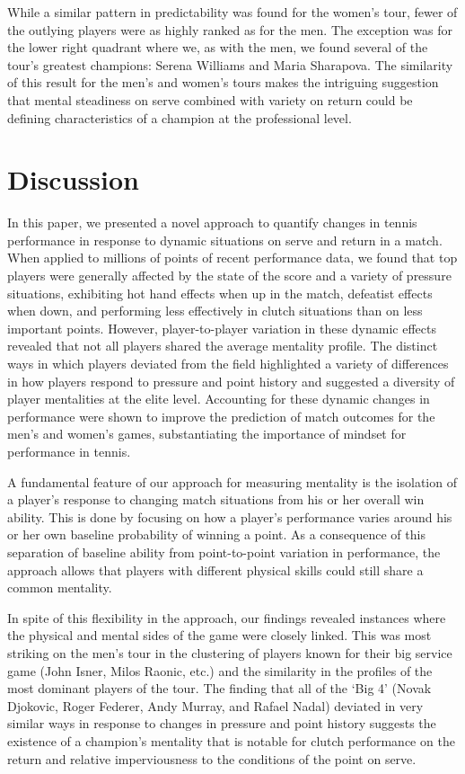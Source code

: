 \documentclass{Latex/svjour3}
\begin{document}
While a similar pattern in predictability was found for the women's
tour, fewer of the outlying players were as highly ranked as for the
men. The exception was for the lower right quadrant where we, as with
the men, we found several of the tour's greatest champions: Serena
Williams and Maria Sharapova. The similarity of this result for the
men's and women's tours makes the intriguing suggestion that mental
steadiness on serve combined with variety on return could be defining
characteristics of a champion at the professional level. 


\section{Discussion}

In this paper, we presented a novel approach to quantify changes in
tennis performance in response to dynamic situations on serve and
return in a match. When applied to millions of points of recent performance data, we found that top players were
generally affected by the state of the score and a variety of pressure
situations, exhibiting hot hand effects when up in the match,
defeatist effects when down, and performing less effectively in clutch
situations than on less important points. However, player-to-player
variation in these dynamic effects revealed that not all players
shared the average mentality profile. The distinct ways in which
players deviated from the field highlighted a variety of differences
in how players respond to pressure and point history and suggested a
diversity of player mentalities at the elite
level. Accounting for these dynamic changes in performance were shown
to improve the prediction of match outcomes for the men's and women's
games, substantiating the importance of mindset for performance in tennis.


A fundamental feature of our approach for measuring mentality is the isolation of a player's response to changing
match situations from his or her overall win ability. This is done by
focusing on how a player's performance varies around his or her own
baseline probability of winning a point. As a
consequence of this separation of baseline ability from point-to-point
variation in performance, the approach allows that players with
different physical skills could still share a common
mentality. 

In spite of this flexibility in the approach, our findings revealed
instances where the physical and
mental sides of the game were closely linked. This was most striking
on the men's tour in the clustering of players known for their big
service game (John Isner, Milos Raonic, etc.) and the similarity in
the profiles of the most dominant players of the tour. The finding
that all of the `Big 4' (Novak Djokovic,
Roger Federer, Andy Murray, and Rafael Nadal) deviated in very similar
ways in response to changes in pressure and point history suggests
the existence of a champion's mentality that is notable for clutch
performance on the return and relative imperviousness to the
conditions of the point on serve. 
\end{document}
